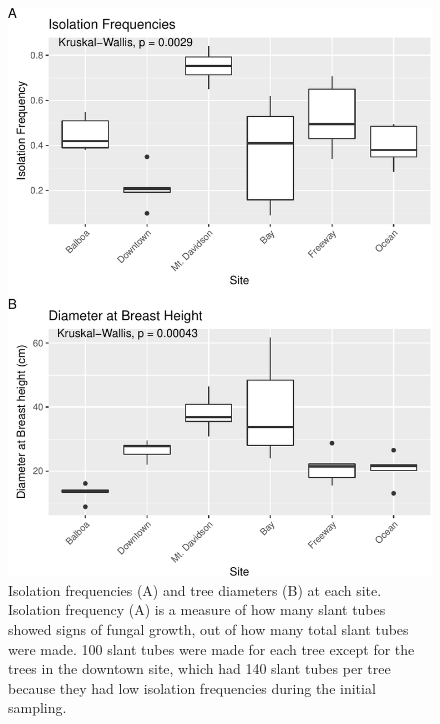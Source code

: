 \documentclass[fleqn,10pt,lineno]{wlpeerj} %
\begin{document}
\begin{figure}
\centering
\includegraphics{gibson2021_files/figure-latex/isolation-dbh-freq-plots-1.pdf}
\caption{\label{fig:isolation-dbh-freq-plots}Isolation frequencies (A) and tree diameters (B) at each site. Isolation frequency (A) is a measure of how many slant tubes showed signs of fungal growth, out of how many total slant tubes were made. 100 slant tubes were made for each tree except for the trees in the downtown site, which had 140 slant tubes per tree because they had low isolation frequencies during the initial sampling.}
\end{figure}
\end{document}
